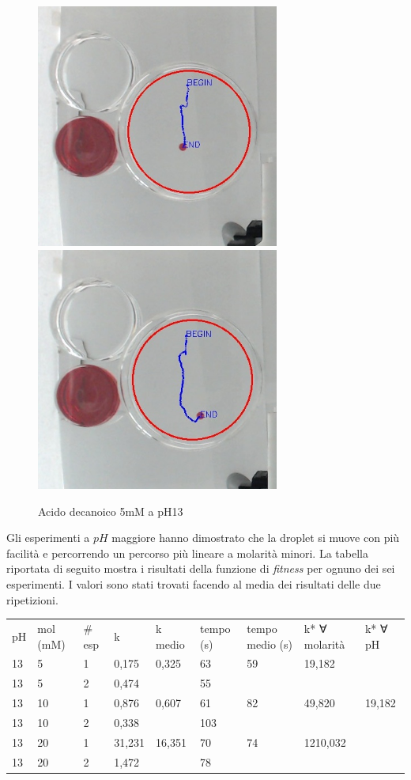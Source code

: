 \begin{figure}[h]
	\centering
   		{\includegraphics[width=8cm]{immagini/5mMpH13-1.jpg}}
 	\hspace{2mm}   	
		{\includegraphics[width=8cm]{immagini/5mMpH13-2.jpg}}
	\caption{Acido decanoico 5mM a pH13}
\end{figure}
\pagebreak
Gli esperimenti a $pH$ maggiore hanno dimostrato che la droplet si muove con più facilità e percorrendo un percorso più lineare a molarità minori. 
La tabella riportata di seguito mostra i risultati della funzione di \emph{fitness} per ognuno dei sei esperimenti. I valori sono stati trovati facendo al media dei risultati delle due ripetizioni.
\begin{center}
\begin{tabular}{lllllllll}
pH & mol (mM) & \# esp & k      & k medio & tempo (s) & tempo medio (s) & k* ∀ molarità & k* ∀ pH \\
13 & 5        & 1      & 0,175  & 0,325   & 63        & 59              & 19,182        &         \\
13 & 5        & 2      & 0,474  &         & 55        &                 &               &         \\
13 & 10       & 1      & 0,876  & 0,607   & 61        & 82              & 49,820        & 19,182  \\
13 & 10       & 2      & 0,338  &         & 103       &                 &               &         \\
13 & 20       & 1      & 31,231 & 16,351  & 70        & 74              & 1210,032      &         \\
13 & 20       & 2      & 1,472  &         & 78        &                 &               &     
\end{tabular}
\end{center}
